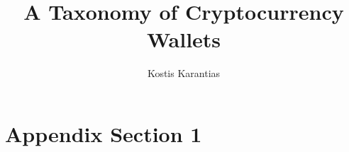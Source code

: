 \documentclass[sigconf,authordraft]{acmart}
\begin{document}
\title{A Taxonomy of Cryptocurrency Wallets}

\author{Kostis Karantias}

\renewcommand{\shortauthors}{Karantias}

\begin{abstract}
    
\end{abstract}

\maketitle











\begin{acks}
\end{acks}




\appendix

\section{Appendix Section 1}
\end{document}
